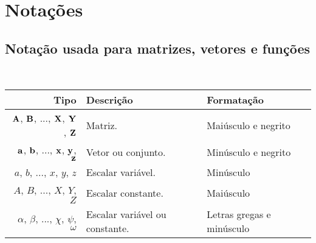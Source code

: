 
\chapter{Notações}

\section{Notação usada para matrizes, vetores e funções}
\begin{notation}~\\
\begin{tabular}{r | p{.4\linewidth} | l}
\hline	
Tipo & Descrição & Formatação \\ \hline
$\MATRIX{A}$, $\MATRIX{B}$, ..., $\MATRIX{X}$, $\MATRIX{Y}$, $\MATRIX{Z}$& Matriz. & Maiúsculo e negrito \\
$\VECTOR{a}$, $\VECTOR{b}$, ..., $\VECTOR{x}$, $\VECTOR{y}$, $\VECTOR{z}$ & Vetor ou conjunto. & Minúsculo e negrito \\
$a$, $b$, ..., $x$, $y$, $z$ & Escalar variável. & Minúsculo \\
$A$, $B$, ..., $X$, $Y$, $Z$ & Escalar constante. & Maiúsculo \\
$\alpha$, $\beta$, ..., $\chi$, $\psi$, $\omega$ & Escalar variável ou constante. & Letras gregas e minúsculo  \\ \hline
\end{tabular}
\end{notation}


